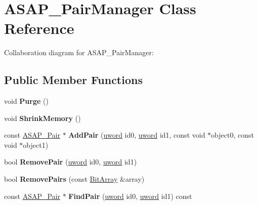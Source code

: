 \hypertarget{class_a_s_a_p___pair_manager}{\section{A\+S\+A\+P\+\_\+\+Pair\+Manager Class Reference}
\label{class_a_s_a_p___pair_manager}
}


Collaboration diagram for A\+S\+A\+P\+\_\+\+Pair\+Manager\+:
\subsection*{Public Member Functions}
\begin{DoxyCompactItemize}
\item 
\hypertarget{class_a_s_a_p___pair_manager_ae4134fd0b2df7648d581c59aab07f965}{void {\bfseries Purge} ()}\label{class_a_s_a_p___pair_manager_ae4134fd0b2df7648d581c59aab07f965}

\item 
\hypertarget{class_a_s_a_p___pair_manager_a59d2bd323cc8bbe67310ddb87b985704}{void {\bfseries Shrink\+Memory} ()}\label{class_a_s_a_p___pair_manager_a59d2bd323cc8bbe67310ddb87b985704}

\item 
\hypertarget{class_a_s_a_p___pair_manager_aa4bc275037842fbe39ea46ea3c2200b9}{const \hyperlink{struct_a_s_a_p___pair}{A\+S\+A\+P\+\_\+\+Pair} $\ast$ {\bfseries Add\+Pair} (\hyperlink{_ice_types_8h_a42fa576a6a3b73c1efc32ab91d176300}{uword} id0, \hyperlink{_ice_types_8h_a42fa576a6a3b73c1efc32ab91d176300}{uword} id1, const void $\ast$object0, const void $\ast$object1)}\label{class_a_s_a_p___pair_manager_aa4bc275037842fbe39ea46ea3c2200b9}

\item 
\hypertarget{class_a_s_a_p___pair_manager_afe8762ff80b99084e3cdec93f639b2c0}{bool {\bfseries Remove\+Pair} (\hyperlink{_ice_types_8h_a42fa576a6a3b73c1efc32ab91d176300}{uword} id0, \hyperlink{_ice_types_8h_a42fa576a6a3b73c1efc32ab91d176300}{uword} id1)}\label{class_a_s_a_p___pair_manager_afe8762ff80b99084e3cdec93f639b2c0}

\item 
\hypertarget{class_a_s_a_p___pair_manager_a65303943382c1cb9124f90d7012ca030}{bool {\bfseries Remove\+Pairs} (const \hyperlink{class_bit_array}{Bit\+Array} \&array)}\label{class_a_s_a_p___pair_manager_a65303943382c1cb9124f90d7012ca030}

\item 
\hypertarget{class_a_s_a_p___pair_manager_a45600a70c6a940ff9ecf3e87fc7a557f}{const \hyperlink{struct_a_s_a_p___pair}{A\+S\+A\+P\+\_\+\+Pair} $\ast$ {\bfseries Find\+Pair} (\hyperlink{_ice_types_8h_a42fa576a6a3b73c1efc32ab91d176300}{uword} id0, \hyperlink{_ice_types_8h_a42fa576a6a3b73c1efc32ab91d176300}{uword} id1) const }\label{class_a_s_a_p___pair_manager_a45600a70c6a940ff9ecf3e87fc7a557f}


\end{DoxyCompactItemize}
